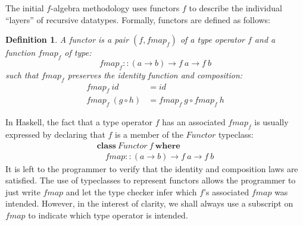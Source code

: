 \documentclass{jfp1}
\newtheorem{definition}{Definition}
\newcommand{\kw}[1]{\textbf{#1}}
\begin{document}
The initial $f$-algebra methodology uses functors $f$ to describe the
individual ``layers'' of recursive datatypes.
Formally, functors are defined as follows:
\begin{definition}\label{defn:functor}
  A \emph{functor} is a pair $(f, \mathit{fmap}_f)$ of a type operator
  $f$ and a function $\mathit{fmap}_f$ of type:
  \begin{displaymath}
    \mathit{fmap}_f :: (a \to b) \to f~a \to f~b
  \end{displaymath}
  such that $\mathit{fmap}_f$ preserves the identity function and
  composition:
  \begin{align}
    \label{eq:fmap-id}
    \mathit{fmap}_f~\mathit{id} & = \mathit{id} \\
    \label{eq:fmap-comp}
    \mathit{fmap}_f~(g \circ h) & = \mathit{fmap}_f~g \circ \mathit{fmap}_f~h
  \end{align}
\end{definition}

In Haskell, the fact that a type operator $f$ has an associated
$\mathit{fmap}_f$ is usually expressed by declaring that $f$ is a
member of the $\mathit{Functor}$ typeclass:
\begin{displaymath}
  \begin{array}{l}
    \kw{class}~\mathit{Functor}~f~\kw{where} \\
    \quad \mathit{fmap} :: (a \to b) \to f~a \to f~b
  \end{array}
\end{displaymath}
It is left to the programmer to verify that the identity and
composition laws are satisfied.
The use of typeclasses to represent functors allows
the programmer to just write $\mathit{fmap}$ and let the type checker
infer which $f$'s associated $\mathit{fmap}$ was intended. However, in
the interest of clarity, we shall always use a subscript on
$\mathit{fmap}$ to indicate which type operator is intended.
\end{document}

